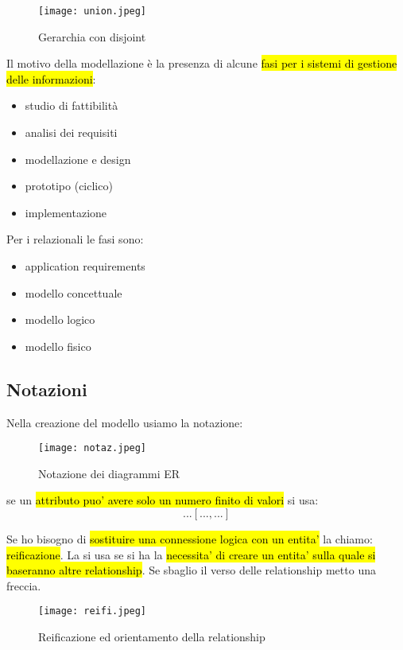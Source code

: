 \begin{figure}[H]
\centering
\texttt{[image: union.jpeg]}
\caption{Gerarchia con disjoint} 
\label{gerardisg}
\end{figure}



Il motivo della modellazione è la presenza di alcune \hl{fasi per i sistemi di gestione delle informazioni}:

\begin{itemize}
	\item studio di fattibilità
	\item analisi dei requisiti
	\item modellazione e design
	\item prototipo (ciclico)
	\item implementazione
\end{itemize}


Per i relazionali le fasi sono:

\begin{itemize}
	\item application requirements
	\item modello concettuale
	\item modello logico
	\item modello fisico
\end{itemize}


\subsection{Notazioni}

Nella creazione del modello usiamo la notazione:


\begin{figure}[H]
\centering
\texttt{[image: notaz.jpeg]}
\caption{Notazione dei diagrammi ER} 
\label{notaz}
\end{figure}


se un \hl{attributo puo' avere solo un numero finito di valori} si usa: $$...[... , ...]$$


Se ho bisogno di \hl{sostituire una connessione logica con un entita'} la chiamo: \hl{reificazione}. La si usa se si ha la \hl{necessita' di creare un entita' sulla quale si baseranno altre relationship}. Se sbaglio il verso delle relationship metto una freccia.


\begin{figure}[H]
\centering
\texttt{[image: reifi.jpeg]}
\caption{Reificazione ed orientamento della relationship} 
\label{reifi}
\end{figure}


